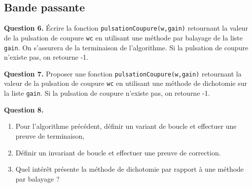 \documentclass[11pt,fleqn]{book} %
\begin{document}
\subsection{Bande passante}

\begin{tBox}
\textbf{Question 6.} Écrire la fonction \texttt{pulsationCoupure(w,gain)} retournant la valeur de la pulsation de coupure \texttt{wc} en utilisant une méthode par balayage de la liste \texttt{gain}. On s'assurera de la terminaison de l'algorithme. Si la pulsation de coupure n'existe pas, on retourne -1.
\end{tBox}



\begin{tBox} 
\textbf{Question 7.} Proposer une fonction \texttt{pulsationCoupure(w,gain)} retournant la valeur de la pulsation de coupure \texttt{wc} en utilisant une méthode de dichotomie sur la liste \texttt{gain}. Si la pulsation de coupure n'existe pas, on retourne -1.
\end{tBox}



\begin{tBox} 
\textbf{Question 8.}
\begin{enumerate}
\item Pour l'algorithme précédent, définir un variant de boucle et effectuer une preuve de terminaison,
\item Définir un invariant de boucle et effectuer une preuve de correction.
\item Quel intérêt présente la méthode de dichotomie par rapport à une méthode par balayage ?
\end{enumerate}
\end{tBox}
\end{document}

